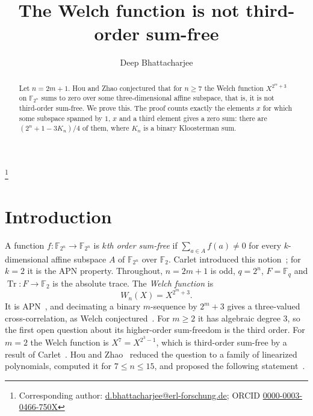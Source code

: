 \documentclass[11pt]{amsart}
\theoremstyle{definition}
\theoremstyle{remark}
\numberwithin{equation}{section}
\newcommand{\F}{\mathbb{F}}
\newcommand{\Tr}{\operatorname{Tr}}
\begin{document}
\title{The Welch function is not third-order sum-free}

\author{Deep Bhattacharjee}
\address{Formerly, Electro-Gravitational Space Propulsion Laboratory (EGSPL),\newline Bhubaneswar, Odisha 751030, India}
\thanks{Corresponding author: \href{mailto:d.bhattacharjee@erl-forschung.de}{d.bhattacharjee@erl-forschung.de}; ORCID \href{https://orcid.org/0000-0003-0466-750X}{\mbox{0000-0003-0466-750X}}}


\begin{abstract}
Let $n=2m+1$. Hou and Zhao conjectured that for $n\ge7$ the Welch function $X^{2^m+3}$ on $\F_{2^n}$ sums to zero over some three-dimensional affine subspace, that is, it is not third-order sum-free. We prove this. The proof counts exactly the elements $x$ for which some subspace spanned by $1$, $x$ and a third element gives a zero sum: there are $(2^n+1-3K_n)/4$ of them, where $K_n$ is a binary Kloosterman sum.
\end{abstract}

\maketitle

\section{Introduction}

A function $f\colon\F_{2^n}\to\F_{2^n}$ is \emph{$k$th order sum-free} if $\sum_{a\in A}f(a)\ne0$ for every $k$-dimensional affine subspace $A$ of $\F_{2^n}$ over $\F_2$. Carlet introduced this notion~\cite{Carlet-JC,Carlet-DCC}; for $k=2$ it is the APN property. Throughout, $n=2m+1$ is odd, $q=2^n$, $F=\F_q$ and $\Tr\colon F\to\F_2$ is the absolute trace. The \emph{Welch function} is
\[
W_n(X)=X^{2^m+3}.
\]
It is APN~\cite{Dobbertin}, and decimating a binary $m$-sequence by $2^m+3$ gives a three-valued cross-correlation, as Welch conjectured~\cite{CCD}. For $m\ge2$ it has algebraic degree $3$, so the first open question about its higher-order sum-freedom is the third order. For $m=2$ the Welch function is $X^7=X^{2^3-1}$, which is third-order sum-free by a result of Carlet~\cite[Proposition~1]{Carlet-JC}. Hou and Zhao~\cite{HZ} reduced the question to a family of linearized polynomials, computed it for $7\le n\le15$, and proposed the following statement~\cite[Conjecture~4.10]{HZ}.
\end{document}
